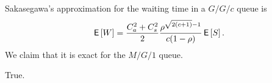 \documentclass[stochastic-or.tex]{subfiles}
\begin{document}

\begin{truefalse}
Sakasegawa's approximation for the waiting time in a $G/G/c$ queue is
\begin{equation*}
 \,\mathsf{E}\left[W\right] = \frac{C_a^2+C_s^2}2 \frac{\rho^{\sqrt{2(c+1)}-1}}{c(1-\rho)} \,\mathsf{E}\left[S\right].
\end{equation*}
We claim that it is exact for the $M/G/1$ queue.
\begin{solution}
True.
\end{solution}
\end{truefalse}
\end{document}
